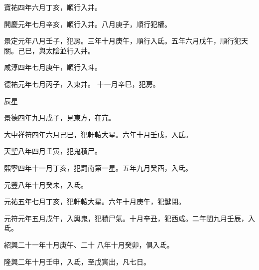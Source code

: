 \begin{pinyinscope}
 寶祐四年六月丁亥，順行入井。



 開慶元年七月辛亥，順行入井。八月庚子，順行犯權。



 景定元年八月壬子，犯房。三年十月庚午，順行入氐。五年六月戊午，順行犯天關。己巳，與太陰並行入井。



 咸淳四年七月庚午，順行入斗。



 德祐元年七月丙子，入東井。
 十一月辛巳，犯房。



 辰星



 景德四年九月戊子，見東方，在亢。



 大中祥符四年六月己巳，犯軒轅大星。六年十月壬戌，入氐。



 天聖八年四月壬寅，犯鬼積尸。



 熙寧四年十一月丁亥，犯罰南第一星。五年九月癸酉，入氐。



 元豐八年十月癸未，入氐。



 元祐五年七月丁亥，犯軒轅大星。六年十月庚午，犯鍵閉。



 元符元年五月戊午，入輿鬼，犯積尸氣。十月辛丑，犯西咸。二年閏九月壬辰，入氐。



 紹興二十一年十月庚午、二十
 八年十月癸卯，俱入氐。



 隆興二年十月壬申，入氐，至戊寅出，凡七日。



\end{pinyinscope}
